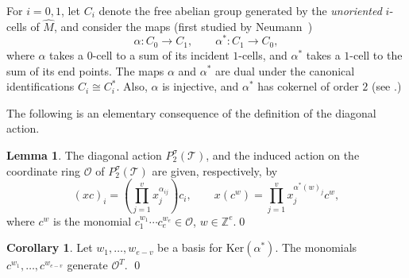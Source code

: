 \documentclass[12pt]{amsart}
\theoremstyle{definition}
\newtheorem{lemma}[theorem]{Lemma}
\newtheorem{corollary}[theorem]{Corollary}
\numberwithin{equation}{section}
\def\Z{\mathbb{Z}}
\def\T{\mathcal{T}}
\def\Ker{\mathrm{Ker}}
\begin{document}
For $i=0,1$, let $C_i$ denote the free abelian group generated by the \emph{unoriented} $i$-cells of $\widehat M$, and consider the maps (first studied by Neumann~\cite{NeumannComb})
\begin{equation}\label{eq:AlphaAlphaStar}
\alpha\colon C_0\to C_1, \qquad \alpha^*\colon C_1\to C_0,
\end{equation}
where $\alpha$ takes a $0$-cell to a sum of its incident $1$-cells, and $\alpha^*$ takes a $1$-cell to the sum of its end points. The maps $\alpha$ and $\alpha^*$ are dual under the canonical identifications $C_i\cong C_i^*$. Also, $\alpha$ is injective, and $\alpha^*$ has cokernel of order $2$ (see \cite{NeumannComb}.)


The following is an elementary consequence of the definition of the diagonal action.
\begin{lemma}
The diagonal action $P_2^\sigma(\T)$, and the induced action on the coordinate ring $\mathcal O$ of $P_2^\sigma(\T)$ are given, respectively, by
\begin{equation}\label{eq:TActionOnPtolemys}
(xc)_i=(\prod_{j=1}^v x_j^{\alpha_{ij}})c_i, \qquad
x(c^w)=\prod_{j=1}^v x_j^{\alpha^*(w)_j}c^w,
\end{equation}
where $c^w$ is the monomial $c_1^{w_1}\cdots c_e^{w_e}\in\mathcal O$, $w\in\Z^e$.\qed
\end{lemma}

\begin{corollary}\label{cor:RingOfInvs}
Let $w_1,\dots,w_{e-v}$ be a basis for $\Ker(\alpha^*)$. The monomials
$c^{w_1},\dots,c^{w_{e-v}}$ generate $\mathcal O^T$.
\qed
\end{corollary}
\end{document}
